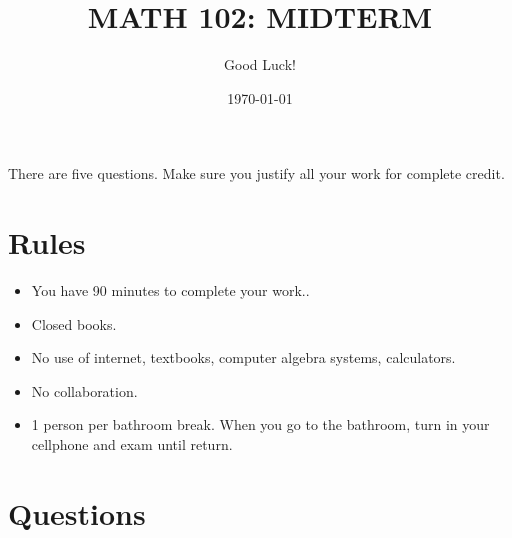 \documentclass[12pt]{amsart}
\title{ MATH 102: MIDTERM }
\author{Good Luck!}
\date{\today}
\begin{document}
\maketitle


There are five questions. Make sure you justify all your work for complete credit.

\section*{Rules}

\begin{itemize}[leftmargin=*]
    \item You have 90  minutes to complete your work..
    \item Closed books.
    \item No use of internet, textbooks, computer algebra systems, calculators. 
    \item No collaboration.
    \item 1 person per bathroom break. When you go to the bathroom, turn in your cellphone and exam until return.
\end{itemize}

\newpage

\section*{Questions}
\end{document}
